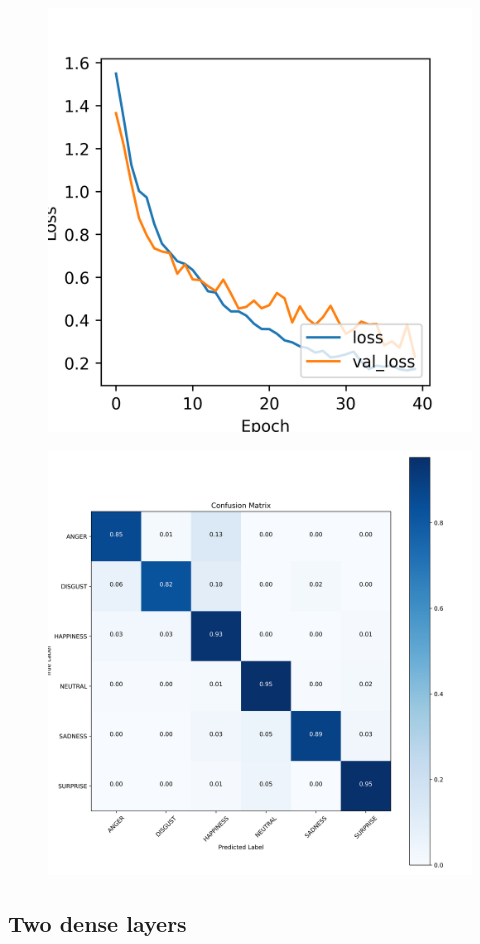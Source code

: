 \begin{figure}[H]
	\centering
	\includegraphics[width=.5\textwidth]{assets/results/preMELD.scratch/model.1dense/learning_history-loss.png}
	
	\label{fig:figure3}
\end{figure}

\begin{figure}[H]
	\centering
	\includegraphics[width=.95\textwidth]{assets/results/preMELD.scratch/model.1dense/confusion_matrix.png}
	
	\label{fig:cm1}
\end{figure}




\subsection{Two dense layers}
\label{scratch.2dense}

